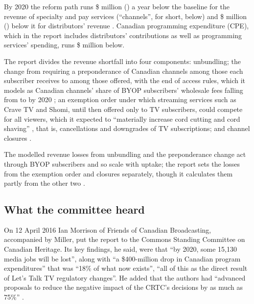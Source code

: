 By 2020 the reform path runs \$\lttvSpecImpactTwenty{} million (\lttvSpecShareTwenty{}) a year below the baseline for the revenue of specialty and pay services (\enquote{channels}, for short, below) and \$\lttvBDUImpactTwenty{} million (\lttvBDUShareTwenty{}) below it for distributors' revenue \citep[paras.~xxvi--xxvii]{nordicity2015television}. Canadian programming expenditure (CPE), which in the report includes distributors' contributions as well as programming services' spending, runs \$\lttvCPEImpactTwenty{} million below.

The report divides the revenue shortfall into four components: unbundling; the change from requiring a preponderance of Canadian channels among those each subscriber receives to among those offered, with the end of access rules, which it models as Canadian channels' share of BYOP subscribers' wholesale fees falling from \lttvPrepFrom{} to \lttvPrepTo{} by 2020 \citep[para.~212]{nordicity2015television}; an exemption order under which streaming services such as Crave TV and Shomi, until then offered only to TV subscribers, could compete for all viewers, which it expected to \enquote{materially increase cord cutting and cord shaving} \citep[para.~xxiii]{nordicity2015television}, that is, cancellations and downgrades of TV subscriptions; and channel closures \citep[Figs.~2--3]{nordicity2015television}.

The modelled revenue losses from unbundling and the preponderance change act through BYOP subscribers and so scale with uptake; the report sets the losses from the exemption order and closures separately, though it calculates them partly from the other two \citep[paras.~220, 234]{nordicity2015television}.

\subsection{What the committee heard}

On 12 April 2016 Ian Morrison of Friends of Canadian Broadcasting, accompanied by Miller, put the report to the Commons Standing Committee on Canadian Heritage. Its key findings, he said, were that \enquote{by 2020, some 15,130 media jobs will be lost}, along with \enquote{a \$400-million drop in Canadian program expenditures} that was \enquote{18\% of what now exists}, \enquote{all of this as the direct result of Let's Talk TV regulatory changes}. He added that the authors had \enquote{advanced proposals to reduce the negative impact of the CRTC's decisions by as much as 75\%} \citep[time marks 0900--0905]{commons2016chpc8}.


